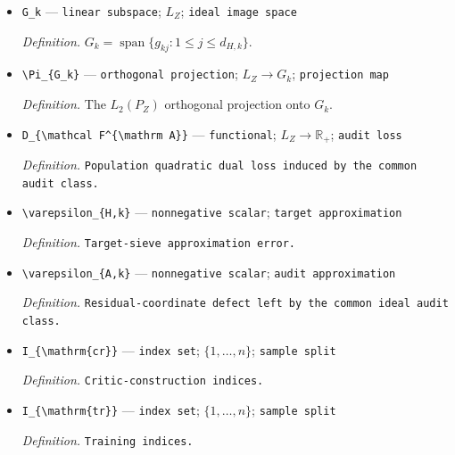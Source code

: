 \documentclass{article}
\begin{document}
\begin{itemize}
  \par\smallskip\noindent\emph{Definition.} \texttt{Dimension of the linear span of the common audit sieve.}
  \item \texttt{G\_\allowbreak{}k} --- \texttt{linear subspace}; \(L_Z\); \texttt{ideal image space}
  \par\smallskip\noindent\emph{Definition.} \(G_k=\operatorname{span}\{g_{kj}:1\le j\le d_{H,k}\}\).
  \item \texttt{\textbackslash{}\allowbreak{}Pi\_\allowbreak{}\{G\_\allowbreak{}k\}\allowbreak{}} --- \texttt{orthogonal projection}; \(L_Z\to G_k\); \texttt{projection map}
  \par\smallskip\noindent\emph{Definition.} The \(L_2(P_Z)\) orthogonal projection onto \(G_k\).
  \item \texttt{D\_\allowbreak{}\{\textbackslash{}\allowbreak{}mathcal F\textasciicircum{}\{\textbackslash{}\allowbreak{}mathrm A\}\allowbreak{}\}\allowbreak{}} --- \texttt{functional}; \(L_Z\to\mathbb R_+\); \texttt{audit loss}
  \par\smallskip\noindent\emph{Definition.} \texttt{Population quadratic dual loss induced by the common audit class.}
  \item \texttt{\textbackslash{}\allowbreak{}varepsilon\_\allowbreak{}\{H,\allowbreak{}k\}\allowbreak{}} --- \texttt{nonnegative scalar}; \texttt{target approximation}
  \par\smallskip\noindent\emph{Definition.} \texttt{Target-\allowbreak{}sieve approximation error.}
  \item \texttt{\textbackslash{}\allowbreak{}varepsilon\_\allowbreak{}\{A,\allowbreak{}k\}\allowbreak{}} --- \texttt{nonnegative scalar}; \texttt{audit approximation}
  \par\smallskip\noindent\emph{Definition.} \texttt{Residual-\allowbreak{}coordinate defect left by the common ideal audit class.}
  \item \texttt{I\_\allowbreak{}\{\textbackslash{}\allowbreak{}mathrm\{cr\}\allowbreak{}\}\allowbreak{}} --- \texttt{index set}; \(\{1,\ldots,n\}\); \texttt{sample split}
  \par\smallskip\noindent\emph{Definition.} \texttt{Critic-\allowbreak{}construction indices.}
  \item \texttt{I\_\allowbreak{}\{\textbackslash{}\allowbreak{}mathrm\{tr\}\allowbreak{}\}\allowbreak{}} --- \texttt{index set}; \(\{1,\ldots,n\}\); \texttt{sample split}
  \par\smallskip\noindent\emph{Definition.} \texttt{Training indices.}

\end{itemize}
\end{document}
